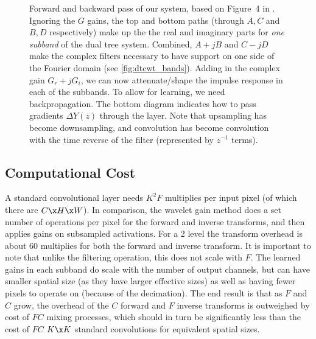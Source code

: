 \begin{figure}[ht]
  \centering
  \subfloat[]{%
    \label{fig:fwd_pass}
  }
   \newline
  \subfloat[]{%
    \label{fig:bwd_pass}
  }
  \caption[Contour Plots]{ Forward and  backward pass of our system, based on Figure~4 in
  \cite{kingsbury_complex_2001}. Ignoring the $G$ gains, the top and bottom paths (through $A, C$
  and $B, D$ respectively) make up the the real and imaginary parts for \emph{one subband} of the dual tree system.
  Combined, $A+jB$ and $C-jD$ make the complex filters necessary to have support on one side of the
  Fourier domain (see \autoref{fig:dtcwt_bands}). Adding in the complex gain $G_r + jG_i$, we can now
  attenuate/shape the impulse response in each of the subbands. To allow for learning, we need
  backpropagation. The bottom diagram indicates how to pass gradients $\Delta Y(z)$ through the
  layer. Note that upsampling has become downsampling, and convolution has become convolution with
  the time reverse of the filter (represented by $z^{-1}$ terms).}
  \label{fig:fwd_bwd}
\end{figure}

\subsection{Computational Cost}
A standard convolutional layer needs $K^2 F$ multiplies per input pixel (of which there are $C\x H\x
W$). In comparison, the wavelet gain method does a set number of operations per pixel for the
forward and inverse transforms, and then applies gains on subsampled activations. For a 2 level
\DTCWT the transform overhead is about 60 multiplies for both the forward and inverse transform. It
is important to note that unlike the filtering operation, this does not scale with $F$. The learned
gains in each subband do scale with the number of output channels, but can have smaller spatial size
(as they have larger effective sizes) as well as having fewer pixels to operate on (because of the
decimation). The end result is that as $F$ and $C$ grow, the overhead of the $C$ forward and $F$
inverse transforms is outweighed by cost of $FC$ mixing processes, which should in turn be
significantly less than the cost of $FC$ $K\x K$ standard convolutions for equivalent spatial sizes.
